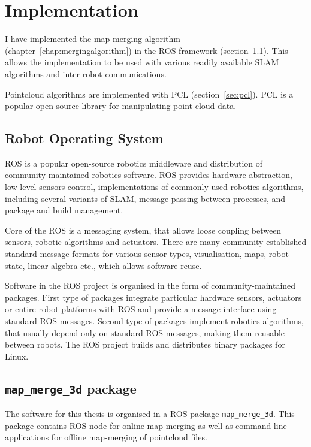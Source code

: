 \chapter{Implementation}
\label{chap:implementation}

I have implemented the map-merging algorithm (chapter~\ref{chap:mergingalgorithm}) in the \gls{ROS} framework (section~\ref{sec:ros}). This allows the implementation to be used with various readily available \gls{SLAM} algorithms and inter-robot communications.

Pointcloud algorithms are implemented with \gls{PCL} (section~\ref{sec:pcl}). \gls{PCL} is a popular open-source library for manipulating point-cloud data.

\section{Robot Operating System}
\label{sec:ros}

\gls{ROS} is a popular open-source robotics middleware and distribution of community-maintained robotics software. \gls{ROS} provides hardware abstraction, low-level sensors control, implementations of commonly-used robotics algorithms, including several variants of \gls{SLAM}, message-passing between processes, and package and build management.

Core of the \gls{ROS} is a messaging system, that allows loose coupling between sensors, robotic algorithms and actuators. There are many community-established standard message formats for various sensor types, visualisation, maps, robot state, linear algebra etc., which allows software reuse.

Software in the \gls{ROS} project is organised in the form of community-maintained packages. First type of packages integrate particular hardware sensors, actuators or entire robot platforms with \gls{ROS} and provide a message interface using standard \gls{ROS} messages. Second type of packages implement robotics algorithms, that usually depend only on standard \gls{ROS} messages, making them reusable between robots. The \gls{ROS} project builds and distributes binary packages for Linux.

\section{\texttt{map\_merge\_3d} package}

The software for this thesis is organised in a \gls{ROS} package \texttt{map\_merge\_3d}. This package contains \gls{ROS} node for online map-merging as well as command-line applications for offline map-merging of pointcloud files.

